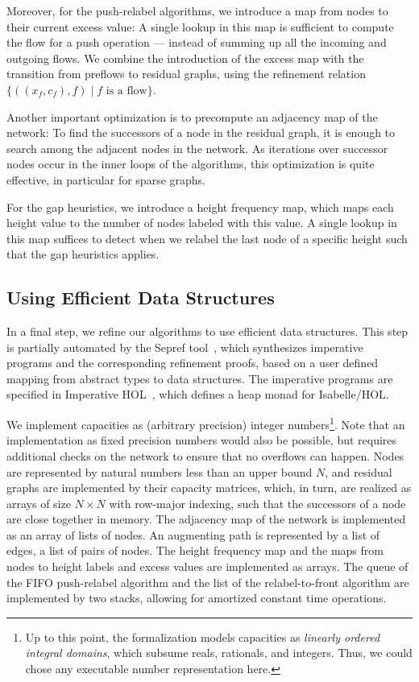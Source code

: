 \documentclass[smallcondensed]{svjour3}     %
\begin{document}
  Moreover, for the push-relabel algorithms, we introduce a map from nodes to their current excess value: 
  A single lookup in this map is sufficient to compute the flow for a push operation --- instead of summing up all 
  the incoming and outgoing flows. We combine the introduction of the excess map with the transition from preflows to residual 
  graphs, using the refinement relation $\{((x_f,c_f),f) \mid \text{$f$ is a flow}\}$.
  
  Another important optimization is to precompute an adjacency map of the network:
  To find the successors of a node in the residual graph, it is enough to search among the adjacent nodes in the network. 
  As iterations over successor nodes occur in the inner loops of the algorithms, this optimization is quite effective, in particular for sparse graphs.

  For the gap heuristics, we introduce a height frequency map, which maps each height value to the number of nodes labeled with this value.
  A single lookup in this map suffices to detect when we relabel the last node of a specific height such that the gap heuristics applies.
  
  
  
  \subsection{Using Efficient Data Structures}\label{sec:impl_data_structures}
  In a final step, we refine our algorithms to use efficient data structures.
  This step is partially automated by the Sepref tool~\cite{La15,La16}, which synthesizes imperative programs and 
  the corresponding refinement proofs, based on a user defined mapping from abstract types to data structures.
  The imperative programs are specified in Imperative HOL~\cite{BKHEM08}, which defines a heap monad for Isabelle/HOL.

  We implement capacities as (arbitrary precision) integer numbers\footnote{Up to this point, the formalization models capacities as \emph{linearly ordered integral domains}, which subsume reals, rationals, and integers. Thus, we could chose any executable number representation here.}. Note that an implementation as fixed precision numbers would also be possible,
  but requires additional checks on the network to ensure that no overflows can happen. 
  Nodes are represented by natural numbers less than an upper bound $N$, and residual graphs are implemented by their capacity matrices, which, in turn,
  are realized as arrays of size $N\times N$ with row-major indexing, such that the successors of a node are close together in memory.
  The adjacency map of the network is implemented as an array of lists of nodes. 
  An augmenting path is represented by a list of edges, \ie a list of pairs of nodes. 
  The height frequency map and the maps from nodes to height labels and excess values are implemented as arrays.
  The queue of the FIFO push-relabel algorithm and the list of the relabel-to-front algorithm are implemented by two stacks, allowing for amortized constant time operations.
\end{document}
